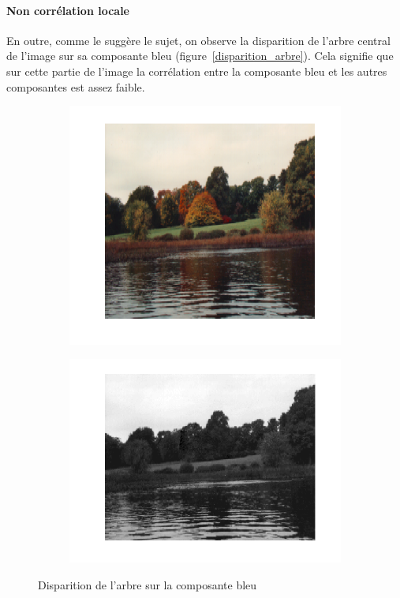 \documentclass{article}
\begin{document}
\paragraph{Non corrélation locale}
En outre, comme le suggère le sujet, on observe la disparition de l'arbre central de l'image sur sa composante bleu (figure~\ref{disparition_arbre}). Cela signifie que sur cette partie de l'image la corrélation entre la composante bleu et les autres composantes est assez faible.
\begin{figure}[!ht]
    \centering
    \begin{subfigure}[c]{0.45\linewidth}
        \centering
        \includegraphics[width=\linewidth]{images/1-autumn_rgb.png}
    \end{subfigure}
    \hfill
    \begin{subfigure}[c]{0.45\linewidth}
        \centering
        \includegraphics[width=\linewidth]{images/1-autumn_b.png}
    \end{subfigure}
    \caption{Disparition de l'arbre sur la composante bleu}
    \label{disparition_arbre}
    \label{truc}
\end{figure}
\end{document}
